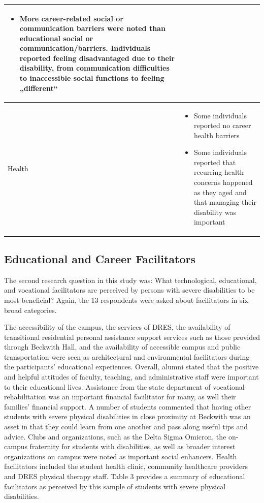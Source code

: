 \documentclass[11.5pt]{sig-alternate} %
\begin{document}
\begin{large}
\begin{table}[th]
\begin{tabular}{|l|l|}
\begin{itemize}[noitemsep, topsep=0pt, leftmargin=*]
\item More career-related social or communication barriers were noted than educational social or communication/barriers. Individuals reported feeling disadvantaged due to their disability, from communication difficulties to inaccessible social functions to
feeling „different``
\end{itemize} \\ \hline
Health &
\begin{itemize}[noitemsep, topsep=0pt, leftmargin=*]
\item Some individuals reported no career health barriers
\item Some individuals reported that recurring health concerns happened as they aged and that managing their disability was important
\end{itemize} \\ \hline
\end{tabular}
\end{table}

\subsection*{Educational and Career Facilitators}
The second research question in this study was: What technological, educational, and vocational facilitators are perceived by persons with severe disabilities to be most beneficial? Again, the 13 respondents were asked about facilitators in six broad categories. 

The accessibility of the campus, the services of DRES, the availability of transitional residential personal assistance support services such as those provided through Beckwith Hall, and the availability of accessible campus and public transportation were seen as architectural and environmental facilitators during the participants' educational experiences. Overall, alumni stated that the positive and helpful attitudes of faculty, teaching, and administrative staff were important to their educational lives. Assistance from the state department of vocational rehabilitation was an important financial facilitator for many, as well their families' financial support. A number of students commented that having other students with severe physical disabilities in close proximity at Beckwith was an asset in that they could learn from one another and pass along useful tips and advice. Clubs and organizations, such as the Delta Sigma Omicron, the on-campus fraternity for students with disabilities, as well as broader interest organizations on campus were noted as important social enhancers. Health facilitators included the student health clinic, community healthcare providers and DRES physical therapy staff. Table 3 provides a summary of educational facilitators as perceived by this sample of students with severe physical disabilities.


\end{large}
\end{document}
